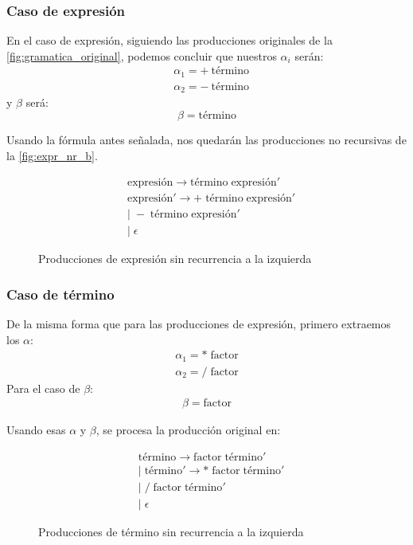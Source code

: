 \documentclass[a4paper,twocolumn]{article}
\begin{document}
    \subsubsection{Caso de expresión}
    En el caso de expresión, siguiendo las producciones originales de la \autoref{fig:gramatica_original}, podemos concluir que nuestros $ \alpha_i $ serán:
    \begin{align*}
        &\alpha_1 = + \: \text{término}\\
        &\alpha_2 = - \: \text{término}
    \end{align*}
    y $ \beta $ será:
    \[\beta = \text{término}\]

    Usando la fórmula antes señalada, nos quedarán las producciones no recursivas de la \autoref{fig:expr_nr_b}.

    \begin{figure}[h]
        \begin{align}
            &\text{expresión} \rightarrow \text{término} \; \text{expresión}' \\
            &\text{expresión}' \rightarrow + \; \text{término} \; \text{expresión}' \\
            &\vert \; - \; \text{término} \; \text{expresión}' \\
            &\vert \; \epsilon
        \end{align}

        \caption{Producciones de expresión sin recurrencia a la izquierda}
        \label{fig:expr_nr_b}
    \end{figure}

    \subsubsection{Caso de término}
    De la misma forma que para las producciones de expresión, primero extraemos los $\alpha$:
    \begin{align}
        \alpha_1 = * \; \text{factor}\nonumber \\
        \alpha_2 = / \; \text{factor}\nonumber
    \end{align}
    Para el caso de $\beta$:
    \begin{align}
        \beta = \text{factor} \nonumber
    \end{align}

    Usando esas $\alpha$ y $\beta$, se procesa la producción original en:

    \begin{figure}[ht]

        \begin{align}
            &\text{término} \rightarrow \text{factor} \; \text{término}' \\
            &\vert \; \text{término}' \rightarrow * \; \text{factor} \; \text{término}' \\
            &\vert \; / \; \text{factor} \; \text{término}'\\
            &\vert \; \epsilon
        \end{align}
        \caption{Producciones de término sin recurrencia a la izquierda}
        \label{fig:Term_nr_b}
    \end{figure}
\end{document}
